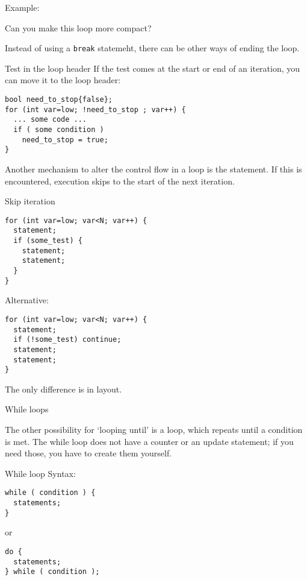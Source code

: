Example:

\begin{exercise}
  Can you make this loop more compact?
\end{exercise}

Instead of using a \lstinline{break} statemeht,
there can be other ways of ending the loop.

\begin{block}{Test in the loop header}
  \label{sl:looptest}
  If the test comes at the start or end of an iteration, you can move it
  to the loop header:
\begin{lstlisting}
bool need_to_stop{false};
for (int var=low; !need_to_stop ; var++) {
  ... some code ...
  if ( some condition )
    need_to_stop = true;
}
\end{lstlisting}
\end{block}

Another mechanism to alter the control flow in a loop is the
 statement. If this is encountered, execution
skips to the start of the next iteration.

\begin{block}{Skip iteration}
  \label{sl:for-cont}
\begin{lstlisting}
for (int var=low; var<N; var++) {
  statement;
  if (some_test) {
    statement;
    statement;
  }
}
\end{lstlisting}
Alternative:
\begin{lstlisting}
for (int var=low; var<N; var++) {
  statement;
  if (!some_test) continue;
  statement;
  statement;
}
\end{lstlisting}
The only difference is in layout.
\end{block}

 {While loops}

The other possibility for `looping until' is a
 loop, which repeats until a condition is met.
The while loop does not have a counter or an update statement; if you
need those, you have to create them yourself.

\begin{block}{While loop}
  \label{sl:while}
  Syntax:
\begin{lstlisting}
while ( condition ) {
  statements;
}
\end{lstlisting}
or
\begin{lstlisting}
do {
  statements;
} while ( condition );
\end{lstlisting}
\end{block}

